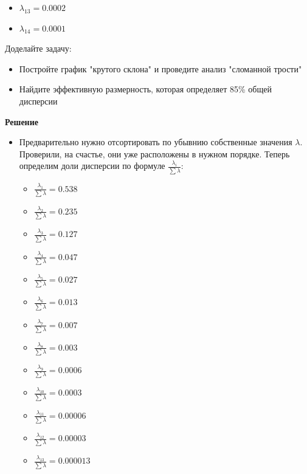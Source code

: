 \begin{enumerate}
\begin{itemize}
\begin{itemize}
            \item $\lambda_{13} = 0.0002$
            \item $\lambda_{14} = 0.0001$
        \end{itemize}
    \end{itemize}\par
    Доделайте задачу: \par
    \begin{itemize}
        \item Постройте график "крутого склона" и проведите анализ "сломанной трости"
        \item Найдите эффективную размерность, которая определяет 85\% общей дисперсии
    \end{itemize}\par
    \textbf{Решение} \par
    \begin{itemize}
        \item Предварительно нужно отсортировать по убывнию собственные значения $\lambda$. Проверили, на счастье, они уже расположены в нужном порядке. Теперь определим доли дисперсии по формуле $\frac{ \lambda_i }{\sum \lambda}$: \par
        \begin{itemize}
            \item $\frac{ \lambda_1 }{\sum \lambda}  = 0.538$
            \item $\frac{ \lambda_2 }{\sum \lambda}  = 0.235$
            \item $\frac{ \lambda_3 }{\sum \lambda}  = 0.127$
            \item $\frac{ \lambda_4 }{\sum \lambda}  = 0.047$
            \item $\frac{ \lambda_5 }{\sum \lambda}  = 0.027$
            \item $\frac{ \lambda_6 }{\sum \lambda} = 0.013$
            \item $\frac{ \lambda_7 }{\sum \lambda}  = 0.007$
            \item $\frac{ \lambda_8 }{\sum \lambda}  = 0.003$
            \item $\frac{ \lambda_9 }{\sum \lambda}  = 0.0006$
            \item $\frac{ \lambda_{10} }{\sum \lambda} = 0.0003$
            \item $\frac{ \lambda_{11} }{\sum \lambda} = 0.00006$
            \item $\frac{ \lambda_{12}}{\sum \lambda} = 0.00003$
            \item $\frac{ \lambda_{13} }{\sum \lambda} = 0.000013$

\end{itemize}
\end{itemize}
\end{enumerate}
